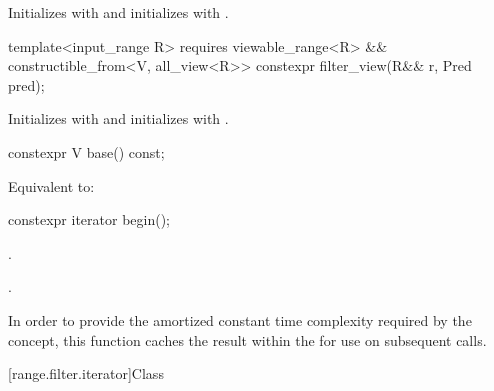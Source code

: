 \begin{itemdescr}
\pnum
\effects
Initializes  with  and initializes
 with .
\end{itemdescr}

%
\begin{itemdecl}
template<input_range R>
  requires viewable_range<R> && constructible_from<V, all_view<R>>
constexpr filter_view(R&& r, Pred pred);
\end{itemdecl}

\begin{itemdescr}
\pnum
\effects
Initializes  with 
and initializes  with .
\end{itemdescr}

%
\begin{itemdecl}
constexpr V base() const;
\end{itemdecl}

\begin{itemdescr}
\pnum
\effects
Equivalent to: 
\end{itemdescr}

%
\begin{itemdecl}
constexpr iterator begin();
\end{itemdecl}

\begin{itemdescr}
\pnum
\expects
{}.

\pnum
\returns
{}.

\pnum
\remarks
In order to provide the amortized constant time complexity required by
the  concept, this function caches the result within the
 for use on subsequent calls.
\end{itemdescr}

[range.filter.iterator]{Class }

